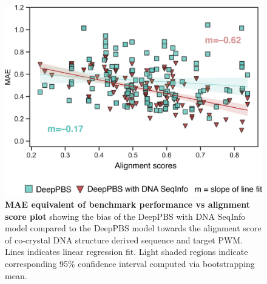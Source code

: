 \begin{center}
\begin{figure}[H]
  \includegraphics[width=\linewidth]{./pdnafigs/figS11.png}
    \caption[MAE equivalent of benchmark performance vs alignment score plot.]{\textbf{MAE equivalent of benchmark performance vs alignment score plot}  showing the bias of the DeepPBS with DNA SeqInfo model compared to the DeepPBS model towards the alignment score of co-crystal DNA structure derived sequence and target PWM. Lines indicates linear regression fit. Light shaded regions indicate corresponding 95$\%$ confidence interval computed via bootstrapping mean.}
  \label{fig:pdnaS11}
\end{figure}
\end{center}

